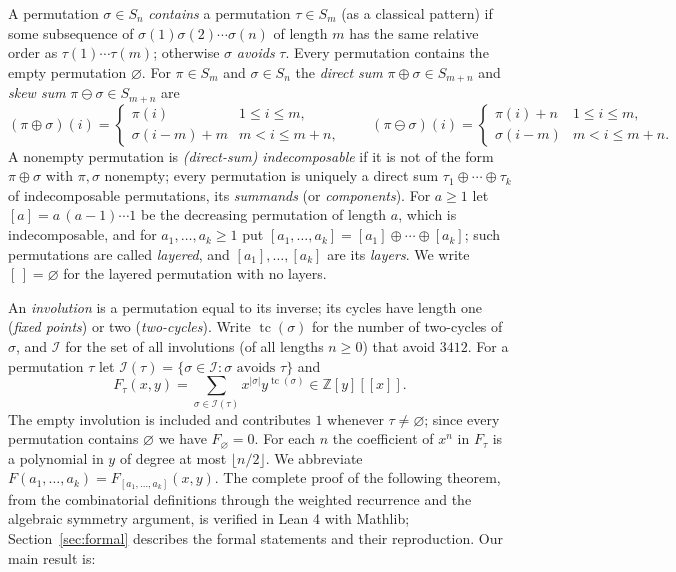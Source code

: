 \documentclass[11pt]{amsart}
\theoremstyle{definition}
\DeclareMathOperator{\tc}{tc}
\newcommand{\I}{\mathcal{I}}
\newcommand{\Z}{\mathbb{Z}}
\newcommand{\ds}{\oplus}
\newcommand{\sk}{\ominus}
\begin{document}
A permutation $\sigma\in S_n$ \emph{contains} a permutation $\tau\in S_m$ (as a classical pattern) if some subsequence of $\sigma(1)\sigma(2)\cdots\sigma(n)$ of length $m$ has the same relative order as $\tau(1)\cdots\tau(m)$; otherwise $\sigma$ \emph{avoids} $\tau$. Every permutation contains the empty permutation $\varnothing$. For $\pi\in S_m$ and $\sigma\in S_n$ the \emph{direct sum} $\pi\ds\sigma\in S_{m+n}$ and \emph{skew sum} $\pi\sk\sigma\in S_{m+n}$ are
\[
(\pi\ds\sigma)(i)=\begin{cases}\pi(i)&1\le i\le m,\\ \sigma(i-m)+m& m<i\le m+n,\end{cases}
\qquad
(\pi\sk\sigma)(i)=\begin{cases}\pi(i)+n&1\le i\le m,\\ \sigma(i-m)& m<i\le m+n.\end{cases}
\]
A nonempty permutation is \emph{(direct-sum) indecomposable} if it is not of the form $\pi\ds\sigma$ with $\pi,\sigma$ nonempty; every permutation is uniquely a direct sum $\tau_1\ds\cdots\ds\tau_k$ of indecomposable permutations, its \emph{summands} (or \emph{components}). For $a\ge1$ let $[a]=a\,(a-1)\cdots 1$ be the decreasing permutation of length $a$, which is indecomposable, and for $a_1,\dots,a_k\ge1$ put $[a_1,\dots,a_k]=[a_1]\ds\cdots\ds[a_k]$; such permutations are called \emph{layered}, and $[a_1],\dots,[a_k]$ are its \emph{layers}. We write $[\,]=\varnothing$ for the layered permutation with no layers.

An \emph{involution} is a permutation equal to its inverse; its cycles have length one (\emph{fixed points}) or two (\emph{two-cycles}). Write $\tc(\sigma)$ for the number of two-cycles of $\sigma$, and $\I$ for the set of all involutions (of all lengths $n\ge0$) that avoid $3412$. For a permutation $\tau$ let $\I(\tau)=\{\sigma\in\I:\sigma\text{ avoids }\tau\}$ and
\begin{equation}\label{eq:Fdef}
F_\tau(x,y)=\sum_{\sigma\in\I(\tau)}x^{|\sigma|}y^{\tc(\sigma)}\in\Z[y][[x]].
\end{equation}
The empty involution is included and contributes $1$ whenever $\tau\ne\varnothing$; since every permutation contains $\varnothing$ we have $F_\varnothing=0$. For each $n$ the coefficient of $x^n$ in $F_\tau$ is a polynomial in $y$ of degree at most $\lfloor n/2\rfloor$. We abbreviate $F(a_1,\dots,a_k)=F_{[a_1,\dots,a_k]}(x,y)$. The complete proof of the following theorem, from the combinatorial definitions through the weighted recurrence and the algebraic symmetry argument, is verified in Lean 4 with Mathlib; Section~\ref{sec:formal} describes the formal statements and their reproduction. Our main result is:
\end{document}
